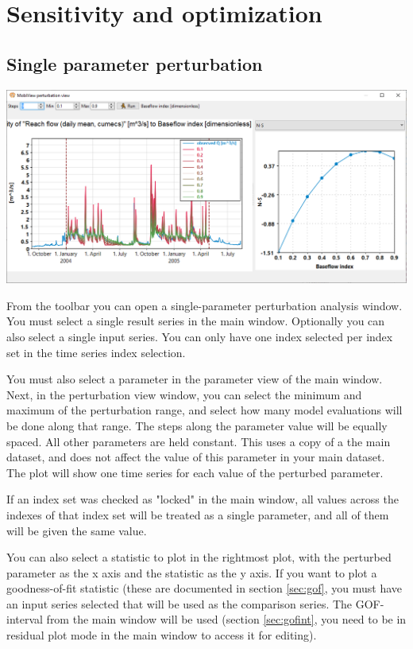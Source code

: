 \documentclass[11pt]{article}
\theoremstyle{definition}
\begin{document}
\section{Sensitivity and optimization}

\subsection{Single parameter perturbation}\label{sec:sensitivity}

\begin{center}
\includegraphics[width=\linewidth]{img/parameterperturbation}
\end{center}

From the toolbar you can open a single-parameter perturbation analysis window. You must select a single result series in the main window. Optionally you can also select a single input series. You can only have one index selected per index set in the time series index selection.

You must also select a parameter in the parameter view of the main window. Next, in the perturbation view window, you can select the minimum and maximum of the perturbation range, and select how many model evaluations will be done along that range. The steps along the parameter value will be equally spaced. All other parameters are held constant. This uses a copy of a the main dataset, and does not affect the value of this parameter in your main dataset. The plot will show one time series for each value of the perturbed parameter.

If an index set was checked as "locked" in the main window, all values across the indexes of that index set will be treated as a single parameter, and all of them will be given the same value.

You can also select a statistic to plot in the rightmost plot, with the perturbed parameter as the x axis and the statistic as the y axis. If you want to plot a goodness-of-fit statistic (these are documented in section \ref{sec:gof}, you must have an input series selected that will be used as the comparison series. The GOF-interval from the main window will be used (section \ref{sec:gofint}, you need to be in residual plot mode in the main window to access it for editing).
\end{document}
